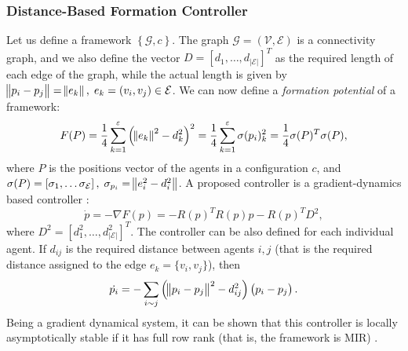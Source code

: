 \documentclass{iacas}
\begin{document}
\subsubsection{Distance-Based Formation Controller}
Let us define a framework $\left\{\mathcal{G}, c \right\}$. The graph $\mathcal{G} = (\mathcal{V}, \mathcal{E})$ is a connectivity graph, and we also define the vector $D = \left[d_1, \ldots, d_{|\mathcal{E}|}\right]^T$ as the required length of each edge of the graph, while the actual length is given by $\norm{p_i-p_j}=\norm{e_k},\; e_k =(v_i,v_j) \in \mathcal{E}$. We can now define a \emph{formation potential} of a framework:
\begin{equation}
F(P) = \frac{1}{4}\sum_{k=1}^{\varepsilon}\left( \norm{e_k}^2 - d_{k}^{2} \right)^2 = \frac{1}{4}\sum_{k=1}^{\varepsilon} \sigma(p_i)_k^2 = \frac{1}{4}\sigma(P)^T \sigma(P),
\label{eq:formation potential}
\end{equation}
where $P$ is the positions vector of the agents in a configuration $c$, and $\sigma(P) = \left[\sigma_1, \ldots \sigma_\mathcal{E} \right], \; \sigma_{p_i} = \norm{e_i^2 - d_{i}^{2}}$.
%
A proposed controller is a gradient-dynamics based controller \cite{Kwang-KyoOh2011,Krick2008}:
\begin{equation}
\dot{p} = -\nabla F(p) = -R(p)^{T} R(p) p - R(p)^{T}D^2,
\label{eq:distance formation controller}
\end{equation}
where $D^2 = \left[d_1^2, \ldots, d_{|\mathcal{E}|}^2\right]^T$. %
The controller can be also defined for each individual agent. If $d_{ij}$ is the required distance between agents $i,j$ (that is the required distance assigned to the edge $e_k = \{v_i, v_j\}$), then
\begin{equation}
    \dot{p_{i}} = -\sum_{i \sim j} \left( \norm{p_{i} - p_{j}}^{2} - d_{ij}^2 \right) \left( p_{i} - p_{j} \right).
    \label{eq:distance formation controller for individual agent}
\end{equation}
Being a gradient dynamical system, it can be shown that this controller is locally asymptotically stable if it has full row rank (that is, the framework is MIR) \cite{Kwang-KyoOh2011,Krick2008}.
\end{document}
